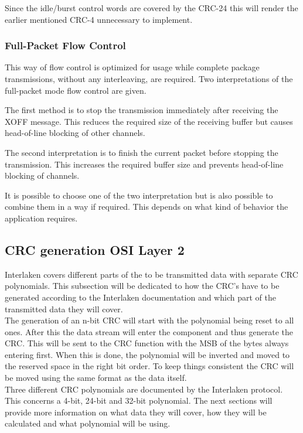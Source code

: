 	Since the idle/burst control words are covered by the CRC-24 this will render the earlier mentioned CRC-4 unnecessary to implement.
	
	\subsubsection{Full-Packet Flow Control}
	This way of flow control is optimized for usage while complete package transmissions, without any interleaving, are required. Two interpretations of the full-packet mode flow control are given. 
	
	The first method is to stop the transmission immediately after receiving the XOFF message. This reduces the required size of the receiving buffer but causes head-of-line blocking of other channels.
	
	The second interpretation is to finish the current packet before stopping the transmission. This increases the required buffer size and prevents head-of-line blocking of channels.
	
	It is possible to choose one of the two interpretation but is also possible to combine them in a way if required. This depends on what kind of behavior the application requires.
	
\newpage


\subsection[CRC generation]{CRC generation \hfill OSI Layer 2}
	\label{subsec:interlaken_CRC}
	Interlaken covers different parts of the to be transmitted data with separate CRC polynomials. This subsection will be dedicated to how the CRC's have to be generated according to the Interlaken documentation and which part of the transmitted data they will cover. \\
	
	The generation of an n-bit CRC will start with the polynomial being reset to all ones. After this the data stream will enter the component and thus generate the CRC. This will be sent to the CRC function with the MSB of the bytes always entering first. When this is done, the polynomial will be inverted and moved to the reserved space in the right bit order. To keep things consistent the CRC will be moved using the same format as the data itself.\\
	
	Three different CRC polynomials are documented by the Interlaken protocol. This concerns a 4-bit, 24-bit and 32-bit polynomial. The next sections will provide more information on what data they will cover, how they will be calculated and what polynomial will be using.
	
